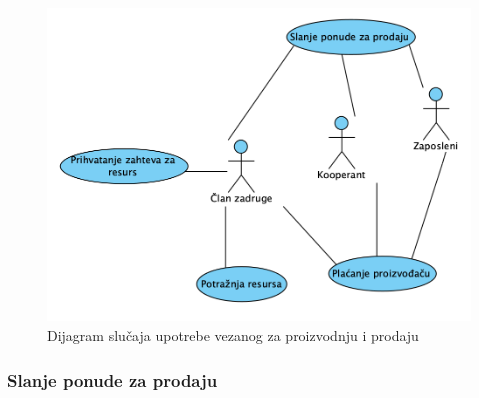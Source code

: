 \documentclass[a4paper]{article}
\begin{document}

\begin{figure}[h!]
    \centering
    \includegraphics[scale=0.64]{images/dslucup_proizvodnja_prodaja.png}
    \caption{Dijagram slučaja upotrebe vezanog za proizvodnju i prodaju}
    \label{dslucup_proizvodnja_prodaja}
\end{figure}

\clearpage

\subsubsection{Slanje ponude za prodaju}
\end{document}
